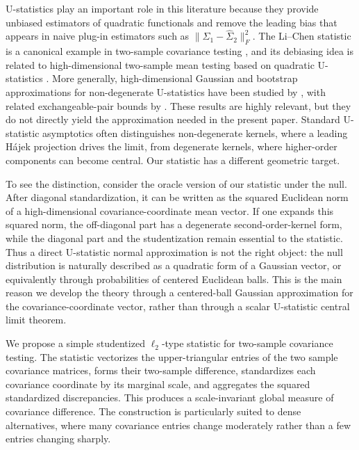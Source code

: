 \documentclass[
  12pt]{article}
\theoremstyle{plain}
\theoremstyle{definition}
\theoremstyle{remark}
\begin{document}
U-statistics play an important role in this literature because they provide
unbiased estimators of quadratic functionals and remove the leading bias that
appears in naive plug-in estimators such as
\(\|\widehat\Sigma_1-\widehat\Sigma_2\|_F^2\).  The Li--Chen statistic is a
canonical example in two-sample covariance testing \citep{li_two_2012}, and
its debiasing idea is related to high-dimensional two-sample mean testing based
on quadratic U-statistics \citep{chen_qin_2010}.  More generally,
high-dimensional Gaussian and bootstrap approximations for non-degenerate
U-statistics have been studied by \citet{chen_gaussian_2018}, with related
exchangeable-pair bounds by \citet{cheng_gaussian_2022}.
These results are highly relevant, but they do not directly yield the
approximation needed in the present paper.  Standard U-statistic asymptotics
often distinguishes non-degenerate kernels, where a leading Hájek projection
drives the limit, from degenerate kernels, where higher-order components can
become central.  Our statistic has a different geometric target.

To see the distinction, consider the oracle version of our statistic under the
null.  After diagonal standardization, it can be written as the squared
Euclidean norm of a high-dimensional covariance-coordinate mean vector.  If one
expands this squared norm, the off-diagonal part has a degenerate
second-order-kernel form, while the diagonal part and the studentization remain
essential to the statistic.  Thus a direct U-statistic normal approximation is
not the right object: the null distribution is naturally described as a
quadratic form of a Gaussian vector, or equivalently through probabilities of
centered Euclidean balls.  This is the main reason we develop the theory through
a centered-ball Gaussian approximation for the covariance-coordinate vector,
rather than through a scalar U-statistic central limit theorem.

We propose a simple studentized \(\ell_2\)-type statistic for two-sample
covariance testing.  The statistic vectorizes the upper-triangular entries of
the two sample covariance matrices, forms their two-sample difference,
standardizes each covariance coordinate by its marginal scale, and aggregates
the squared standardized discrepancies.  This produces a scale-invariant global
measure of covariance difference.  The construction is particularly suited to
dense alternatives, where many covariance entries change moderately rather than
a few entries changing sharply.
\end{document}
